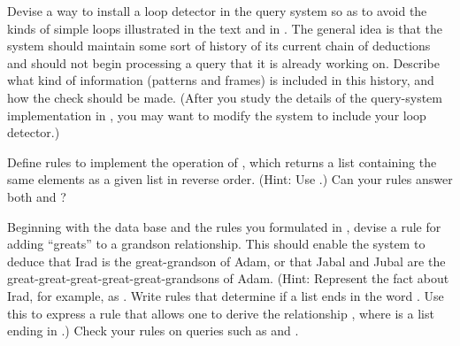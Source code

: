 \begin{exercise}
	\label{Exercise 4.67}
	Devise a way to install a loop detector in the query system so as to avoid the kinds of simple loops illustrated in the text and in .
	The general idea is that the system should maintain some sort of history of its current chain of deductions and should not begin processing a query that it is already working on.
	Describe what kind of information (patterns and frames) is included in this history, and how the check should be made.
	(After you study the details of the query-system implementation in , you may want to modify the system to include your loop detector.)
\end{exercise}



\begin{exercise}
	\label{Exercise 4.68}
	Define rules to implement the  operation of , which returns a list containing the same elements as a given list in reverse order.
	(Hint: Use .)
	Can your rules answer both  and  ?
\end{exercise}



\begin{exercise}
	\label{Exercise 4.69}
	Beginning with the data base and the rules you formulated in , devise a rule for adding “greats” to a grandson relationship.
	This should enable the system to deduce that Irad is the great-grandson of Adam, or that Jabal and Jubal are the great-great-great-great-great-grandsons of Adam.
	(Hint:
	Represent the fact about Irad, for example, as .
	Write rules that determine if a list ends in the word .
	Use this to express a rule that allows one to derive the relationship , where  is a list ending in .)
	Check your rules on queries such as  and .
\end{exercise}
